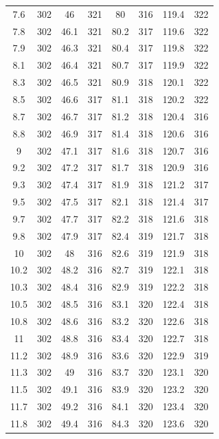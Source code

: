 \documentclass[12pt]{ctexart}
\numberwithin{equation}{section}
\begin{document}
\begin{longtable}{cc|cc|cc|cc}
7.6  &  302  &  46  &  321  &  80  &  316  &  119.4  &  322  \\
7.8  &  302  &  46.1  &  321  &  80.2  &  317  &  119.6  &  322  \\
7.9  &  302  &  46.3  &  321  &  80.4  &  317  &  119.8  &  322  \\
8.1  &  302  &  46.4  &  321  &  80.7  &  317  &  119.9  &  322  \\
8.3  &  302  &  46.5  &  321  &  80.9  &  318  &  120.1  &  322  \\
8.5  &  302  &  46.6  &  317  &  81.1  &  318  &  120.2  &  322  \\
8.7  &  302  &  46.7  &  317  &  81.2  &  318  &  120.4  &  316  \\
8.8  &  302  &  46.9  &  317  &  81.4  &  318  &  120.6  &  316  \\
9  &  302  &  47.1  &  317  &  81.6  &  318  &  120.7  &  316  \\
9.2  &  302  &  47.2  &  317  &  81.7  &  318  &  120.9  &  316  \\
9.3  &  302  &  47.4  &  317  &  81.9  &  318  &  121.2  &  317  \\
9.5  &  302  &  47.5  &  317  &  82.1  &  318  &  121.4  &  317  \\
9.7  &  302  &  47.7  &  317  &  82.2  &  318  &  121.6  &  318  \\
9.8  &  302  &  47.9  &  317  &  82.4  &  319  &  121.7  &  318  \\
10  &  302  &  48  &  316  &  82.6  &  319  &  121.9  &  318  \\
10.2  &  302  &  48.2  &  316  &  82.7  &  319  &  122.1  &  318  \\
10.3  &  302  &  48.4  &  316  &  82.9  &  319  &  122.2  &  318  \\
10.5  &  302  &  48.5  &  316  &  83.1  &  320  &  122.4  &  318  \\
10.8  &  302  &  48.6  &  316  &  83.2  &  320  &  122.6  &  318  \\
11  &  302  &  48.8  &  316  &  83.4  &  320  &  122.7  &  318  \\
11.2  &  302  &  48.9  &  316  &  83.6  &  320  &  122.9  &  319  \\
11.3  &  302  &  49  &  316  &  83.7  &  320  &  123.1  &  320  \\
11.5  &  302  &  49.1  &  316  &  83.9  &  320  &  123.2  &  320  \\
11.7  &  302  &  49.2  &  316  &  84.1  &  320  &  123.4  &  320  \\
11.8  &  302  &  49.4  &  316  &  84.3  &  320  &  123.6  &  320  \\

\end{longtable}
\end{document}
